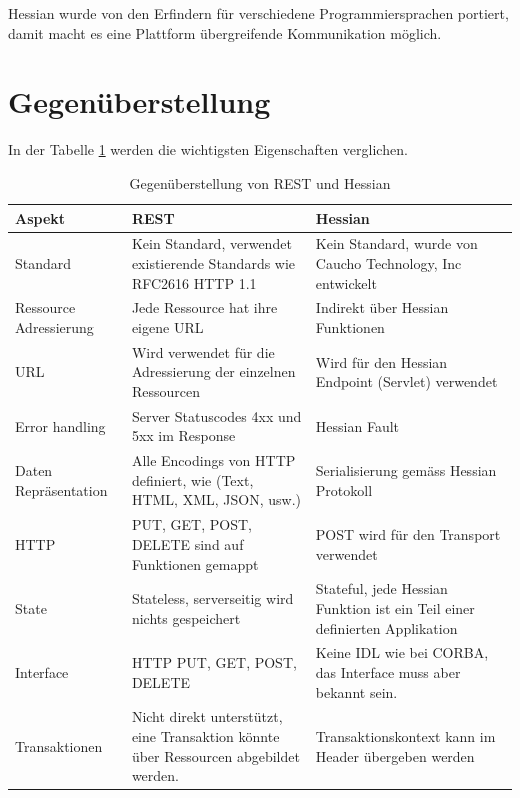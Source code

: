 \documentclass[abstracton, listof=totocnumbered,
bibliography=totocnumbered]{scrreprt}
\begin{document}
  Hessian wurde von den Erfindern für verschiedene Programmiersprachen portiert,
  damit macht es eine Plattform übergreifende Kommunikation möglich.
  
  \enlargethispage{3cm}
  
  \section{Gegenüberstellung}
  
  In der Tabelle \ref{tab:gegenueberstellungRestHessian} werden die wichtigsten
  Eigenschaften verglichen.
  \newline
  
  \begin{table}[h]
    \begin{center}
      \begin{tabular}{p{2.4cm}p{6.1cm}p{6.1cm}}
        \toprule
        Aspekt & REST & Hessian \\
        \midrule
        \nohyphens{Standard} & Kein Standard, verwendet existierende Standards wie
        RFC2616 HTTP 1.1 & Kein Standard, wurde von Caucho Technology, Inc entwickelt\\
        \cmidrule{2-3}
        \nohyphens{Ressource Adressierung} & Jede Ressource hat ihre eigene \ac{URL}
        & Indirekt über Hessian Funktionen\\
        \cmidrule{2-3}
        \nohyphens{URL} & Wird verwendet für die Adressierung der einzelnen
        Ressourcen & Wird für den Hessian Endpoint (Servlet) verwendet\\
        \cmidrule{2-3}
        \nohyphens{Error handling} & Server Statuscodes 4xx und 5xx im Response &
        Hessian Fault\\
        \cmidrule{2-3}
        \nohyphens{Daten Repräsentation} & Alle Encodings von \ac{HTTP} definiert,
        wie (Text, \ac{HTML}, \ac{XML}, \ac{JSON}, usw.) & Serialisierung
        gemäss Hessian Protokoll\\
        \cmidrule{2-3}
        \nohyphens{HTTP} & PUT, GET, POST, DELETE sind auf Funktionen gemappt & POST
        wird für den Transport verwendet\\
        \cmidrule{2-3}
        \nohyphens{State} & Stateless, serverseitig wird nichts gespeichert &
        Stateful, jede Hessian Funktion ist ein Teil einer definierten Applikation\\
        \cmidrule{2-3}
        \nohyphens{Interface} & \ac{HTTP} PUT, GET, POST, DELETE & Keine \ac{IDL}
        wie bei \ac{CORBA}, das Interface muss aber bekannt sein.\\
        \cmidrule{2-3}
        \nohyphens{Transaktionen} & Nicht direkt unterstützt, eine Transaktion
        könnte über Ressourcen abgebildet werden. & Transaktionskontext kann im Header übergeben
        werden\\
        \bottomrule
      \end{tabular}
      \caption{Gegenüberstellung von REST und Hessian}
      \label{tab:gegenueberstellungRestHessian}
    \end{center}
  \end{table}
  
\end{document}
